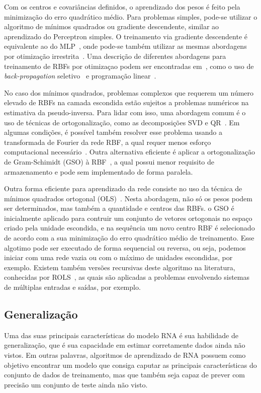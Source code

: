 \documentclass[conference]{IEEEtran}
\begin{document}
	Com os centros e covariâncias definidos, o aprendizado dos pesos é feito pela minimização do erro quadrático médio. Para problemas simples, pode-se utilizar o algoritmo de mínimos quadrados ou gradiente descendente, similar ao aprendizado do Perceptron simples. O treinamento via gradiente descendente é equivalente ao do MLP~\cite{wettschereck1992improving}, onde pode-se também utilizar as mesmas abordagens por otimização irrestrita~\cite{du2006neural}.	Uma descrição de diferentes abordagens para treinamento de RBFs por otimizaçao podem ser encontradas em~\cite{wu2012using}, como o uso de \textit{back-propagation} seletivo~\cite{vakil2004training} e programação linear~\cite{roy1995algorithm}.
	
	No caso dos mínimos quadrados, problemas complexos que requerem um número elevado de RBFs na camada escondida estão sujeitos a problemas numéricos na estimativa da pseudo-inversa. Para lidar com isso, uma abordagem comum é o uso de técnicas de ortogonalização, como as decomposições SVD e QR~\cite{golub1980analysis}. Em algumas condições, é possível também resolver esse problema usando a transformada de Fourier da rede RBF, a qual requer menos esforço computacional necessário~\cite{abe2003fast}. Outra alternativa eficiente é aplicar a ortogonalização de Gram-Schimidt (GSO) à RBF~\cite{kaminski1997kernel}, a qual possui menor requisito de armazenamento e pode sem implementado de forma paralela.
	
	Outra forma eficiente para aprendizado da rede consiste no uso da técnica de mínimos quadrados ortogonal (OLS)~\cite{chen1991orthogonal, chen1992orthogonal, chen1995fast, hong1997givens}. Nesta abordagem, não só os pesos podem ser determinados, mas também a quantidade e centros das RBFs. o GSO é inicialmente aplicado para contruir um conjunto de vetores ortogonais no espaço criado pela unidade escondida, e na sequência um novo centro RBF é selecionado de acordo com a sua minimização do erro quadrático médio de treinamento. Esse algotimo pode ser executado de forma sequencial ou reversa, ou seja, podemos iniciar com uma rede vazia ou com o máximo de unidades escondidas, por exemplo. Existem também versões recursivas deste algoritmo na literatura, conhecidas por ROLS~\cite{yu1997recursive}, as quais são aplicadas a problemas envolvendo sistemas de múltiplas entradas e saídas, por exemplo.
	

	\subsection{Generalização} \label{sec:generalization}
    Uma das suas principais características do modelo RNA é sua habilidade de generalização, que é sua capacidade em estimar corretamente dados ainda não vistos. Em outras palavras, algoritmos de aprendizado de RNA possuem como objetivo encontrar um modelo que consiga caputar as principais características do conjunto de dados de treinamento, mas que também seja capaz de prever com precisão um conjunto de teste ainda não visto.
        
\end{document}
